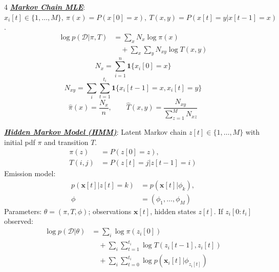 \documentclass[12pt]{article}
\newcommand{\bulletPoint}[1]{\ul{\textit{\textbf{#1}}}}
\begin{document}
\begin{multicols*}{4}
\bulletPoint{Markov Chain MLE}:
$x_i[t]\in\{1,\ldots,M\},\ \pi(x)=P(x[0]=x),\ T(x,y)=P(x[t]=y|x[t-1]=x)$.
\useshortskip \begin{equation*}
    \begin{split}
        \scriptstyle \log p(\mathcal{D}|\pi,T)
        &\scriptstyle =\sum_x N_x\log\pi(x)\\
        &\scriptstyle \quad+\sum_x\sum_y N_{xy}\log T(x,y)
    \end{split}
\end{equation*}
\useshortskip \begin{equation*}
    N_x=\sum_{i=1}^n\mathbf{1}\{x_i[0]=x\}
\end{equation*}
\useshortskip \begin{equation*}
    \scriptstyle N_{xy}=\sum_i\sum_{t=1}^{t_i}
    \mathbf{1}\{x_i[t-1]=x,x_i[t]=y\}
\end{equation*}
\useshortskip \begin{equation*}
    \hat{\pi}(x)=\frac{N_x}{n},\qquad
    \hat{T}(x,y)=\frac{N_{xy}}{\sum_{z=1}^M N_{xz}}
\end{equation*}

\bulletPoint{Hidden Markov Model (HMM)}:
Latent Markov chain $z[t]\in\{1,\ldots,M\}$ with initial pdf $\pi$ and transition $T$.
\useshortskip \begin{equation*}
    \begin{split}
        \pi(z)&=P(z[0]=z),\\
        T(i,j)&=P(z[t]=j|z[t-1]=i)
    \end{split}
\end{equation*}
Emission model:
\useshortskip \begin{equation*}
    \begin{split}
        p(\mathbf{x}[t]|z[t]=k)&=p(\mathbf{x}[t]|\phi_k),\\
        \phi&=(\phi_1,\ldots,\phi_M)
    \end{split}
\end{equation*}
Parameters: $\theta=(\pi,T,\phi)$; observations $\mathbf{x}[t]$, hidden states $z[t]$.
If $z_i[0:t_i]$ observed:
\useshortskip \begin{equation*}
    \begin{split}
        \scriptstyle \log p(\mathcal{D}|\theta)
        &\scriptstyle =\sum_i\log\pi(z_i[0])\\
        &\scriptstyle \quad+\sum_i\sum_{t=1}^{t_i}
        \log T(z_i[t-1],z_i[t])\\
        &\scriptstyle \quad+\sum_i\sum_{t=0}^{t_i}
        \log p(\mathbf{x}_i[t]|\phi_{z_i[t]})
    \end{split}
\end{equation*}


\end{multicols*}
\end{document}
